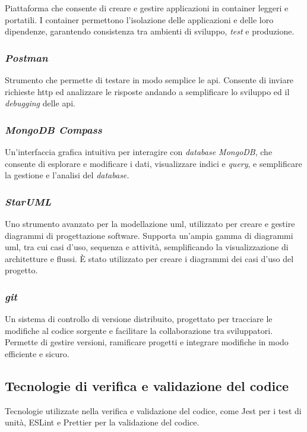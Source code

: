 Piattaforma che consente di creare e gestire applicazioni in \gls{container} leggeri e portatili.
I \gls{container} permettono l’isolazione delle applicazioni e delle loro dipendenze, garantendo consistenza tra ambienti di sviluppo, \textit{test} e produzione.

\subsubsection{\textit{Postman}}

Strumento che permette di testare in modo semplice le \gls{api}. 
Consente di inviare richieste \gls{http} ed analizzare le risposte andando a semplificare lo sviluppo ed il \textit{debugging} delle \gls{api}.

\subsubsection{\textit{MongoDB Compass}}

Un'interfaccia grafica intuitiva per interagire con \textit{database MongoDB}, che consente di esplorare e modificare i dati, visualizzare indici e \textit{query},
e semplificare la gestione e l'analisi del \textit{database.}

\subsubsection{\textit{StarUML}}

Uno strumento avanzato per la modellazione \gls{uml}, utilizzato per creare e gestire diagrammi di progettazione software. Supporta un'ampia gamma di diagrammi \gls{uml}, tra cui casi d'uso, sequenza e attività, semplificando la visualizzazione di architetture e flussi.
È stato utilizzato per creare i diagrammi dei casi d’uso del progetto.


\subsubsection{\textit{git}}

Un sistema di controllo di versione distribuito, progettato per tracciare le modifiche al codice sorgente e facilitare la collaborazione tra sviluppatori. \\
Permette di gestire versioni, ramificare progetti e integrare modifiche in modo efficiente e sicuro. 


\subsection{Tecnologie di verifica e validazione del codice}
\label{sez:tecnologie-validazione-codice}

Tecnologie utilizzate nella verifica e validazione del codice, come Jest per i test di unità, ESLint e Prettier per la validazione del codice. 